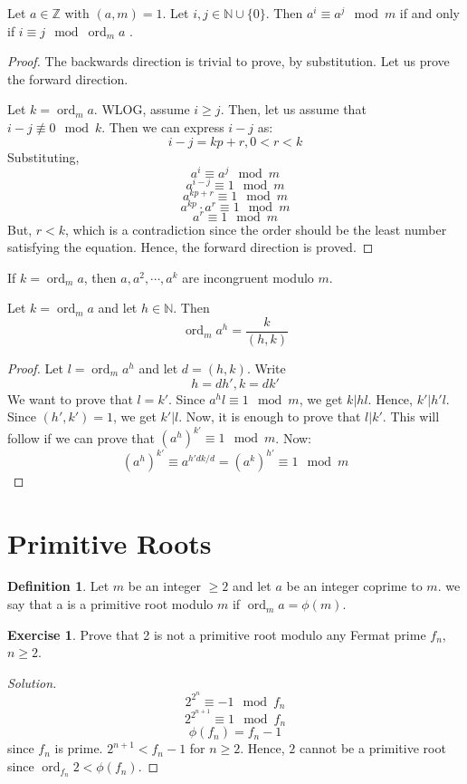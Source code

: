 \documentclass[12pt,letterpaper]{book}
\theoremstyle{definition}
\newtheorem{definition}{Definition} %
\newtheorem*{exercise}{Exercise}
\newenvironment{solution}
  {\renewcommand\qedsymbol{$\blacksquare$}\begin{proof}[Solution]}
  {\end{proof}}
\newcommand{\N}{\mathbb{N}}
\newcommand{\Z}{\mathbb{Z}}
\DeclareMathOperator{\ord}{ord}
\begin{document}
\begin{lemma}
  Let $a \in \Z$ with $(a,m) = 1$. Let $i,j \in \N \cup \{0\}$. Then $a^i \equiv a^j \mod m$ if and only if $i \equiv j \mod \ord_m a$  .
\end{lemma}
\begin{proof}
  The backwards direction is trivial to prove, by substitution. Let us prove the forward direction.
  
  Let $k = \ord_m a$. WLOG, assume $i \geq j$. Then, let us assume that $i-j \not \equiv 0 \mod k$. Then we can express $i-j$ as:
  \[i-j = kp + r, 0 < r < k \]
  Substituting,
  \[a^{i} \equiv a^j \mod m\]
  \[a^{i-j} \equiv 1 \mod m\]
  \[a^{kp+r} \equiv 1 \mod m\]
  \[a^{kp} \cdot a^r \equiv 1 \mod m\]
  \[a^r \equiv 1 \mod m\]
  But, $r < k$, which is a contradiction since the order should be the least number satisfying the equation. Hence, the forward direction is proved.
\end{proof}

\begin{corollary}
If $k = \ord_m a$, then $a,a^2, \cdots , a^k$ are incongruent modulo $m$.
\end{corollary}

\begin{lemma}
  Let $k = \ord_m a$ and let $h \in \N$. Then
  \[\ord_m a^h = \frac{k}{(h,k)}\]
\end{lemma}
\begin{proof}
  Let $l = \ord_m a^h$ and let $d = (h,k)$. Write
  \[h = dh', k = dk'\]
  We want to prove that $l = k'$. Since $a^hl \equiv 1 \mod m$, we get $k|hl$. Hence, $k' | h'l$. Since $(h',k') = 1$, we get $k'|l$. Now, it is enough to prove that $l|k'$. This will follow if we can prove that $(a^h)^{k'} \equiv 1 \mod m$. Now:
  \[(a^h)^{k'} \equiv a^{h'dk/d} = (a^k)^{h'} \equiv 1 \mod m\]
\end{proof}

\section{Primitive Roots}

\begin{definition}
  Let $m$ be an integer $\geq 2$ and let $a$ be an integer coprime to $m$. we say that a is a primitive root modulo $m$ if $\ord_m a = \phi(m)$.
\end{definition}

\begin{exercise}
  Prove that 2 is not a primitive root modulo any Fermat prime $f_n$, $n \geq 2$.
\end{exercise}
\begin{solution}
  \[2^{2^n} \equiv -1 \mod f_n\] 
  \[2^{2^{n+1}} \equiv 1 \mod f_n\]
  \[\phi(f_n) = f_n-1\]
  since $f_n$ is prime. $2^{n+1} < f_n-1$ for $n \geq 2$. Hence, $2$ cannot be a primitive root since $\ord_{f_n} 2 < \phi(f_n)$.
\end{solution}
\end{document}
